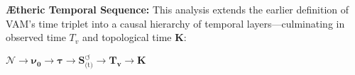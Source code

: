 

\vspace{0.8em}

\noindent\textbf{Ætheric Temporal Sequence:}
This analysis extends the earlier definition of VAM’s time triplet into a causal hierarchy of temporal layers—culminating in observed time \(T_v\) and topological time \(\mathbb{\boldsymbol{K}}\):

\begin{center}
    \(\boldsymbol{\mathcal{N}} \to \boldsymbol{\nu_0} \to \boldsymbol{\tau} \to \boldsymbol{S}^{\boldsymbol{\circlearrowleft}}_\text{(t)} \to \boldsymbol{T_v} \to \mathbb{\boldsymbol{K}}\)
\end{center}
